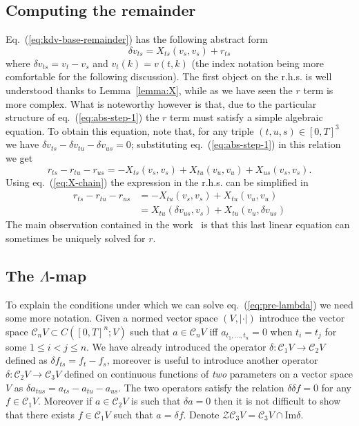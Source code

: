 \documentclass[a4paper,11pt,reqno]{article}
\newcommand{\der}{\delta}
\newcommand{\CC}{\mathcal{C}}
\newcommand{\cZ}{\mathcal{Z}}
\begin{document}
\subsection{Computing the remainder}

Eq.~(\ref{eq:kdv-base-remainder}) has the following abstract form
\begin{equation}
  \label{eq:abs-step-1}
\der v_{ts}  = X_{ts}(v_s,v_s) + r_{ts}  
\end{equation}
where $\der v_{ts} = v_t - v_s$ and $v_t(k) = v(t,k)$ (the index
notation being more comfortable for the following discussion). The
first object on the r.h.s. is well understood thanks to
Lemma~\ref{lemma:X}, while as we have seen the $r$ term is more
complex. What is noteworthy however is that, due to the particular
structure of eq.~(\ref{eq:abs-step-1}) the $r$ term must satisfy a simple
algebraic equation. To obtain this equation, note that, for any triple
$(t,u,s) \in [0,T]^3$ we have
$
\der v_{ts} - \der v_{tu} - \der v_{us} = 0
$; substituting eq.~(\ref{eq:abs-step-1}) in this relation we get
$$
 r_{ts} -
r_{tu} - r_{us}   = 
- X_{ts}(v_s,v_s) + X_{tu}(v_u,v_u) + X_{us}(v_s,v_s).   
$$
Using eq.~(\ref{eq:X-chain}) the expression in the r.h.s. can be
simplified in
\begin{equation}
\label{eq:pre-lambda}
  \begin{split}
 r_{ts} -
r_{tu} - r_{us}  & = 
- X_{tu}(v_s,v_s) + X_{tu}(v_u,v_u)   
    \\  & = 
 X_{tu}(\der v_{us},v_s) + X_{tu}(v_u,\der v_{us})   
  \end{split}
\end{equation}
The main observation contained in the work~\cite{MR2091358} is that this
last linear equation can sometimes be uniquely solved for $r$.


\subsection{The $\Lambda$-map}
To explain the conditions under which we can solve
eq.~(\ref{eq:pre-lambda}) we need some more notation. 
Given a normed vector space $(V,|\cdot|)$ introduce the vector space
$\CC_n V \subset C([0,T]^n;V)$ such that $a \in \CC_n V$ iff $ a_{t_1, \dots,t_n} = 0$ when $t_i
  = t_j$ for some $1 \le i < j \le n$. We have already introduced the
  operator $\der : \CC_1 V \to \CC_2 V$ defined as $\der f_{ts} = f_t
  - f_s$, moreover is useful to introduce
another operator $\der : \CC_2 V \to \CC_3 V$ defined on
continuous functions of \emph{two} parameters 
on a vector space $V$ as
$ \der a_{tus} = a_{ts} - a_{tu} - a_{us} $. The two operators satisfy
the relation $\der \der f = 0$ for any $f \in \CC_1 V$. Moreover if $a
\in \CC_2 V$ is such that $\der a = 0$ then it is not difficult to
show that there exists $f \in \CC_1 V$ such that $ a = \der f$. Denote
$\cZ \CC_3 V = \CC_3 V \cap \text{Im} \der$.
\end{document}
